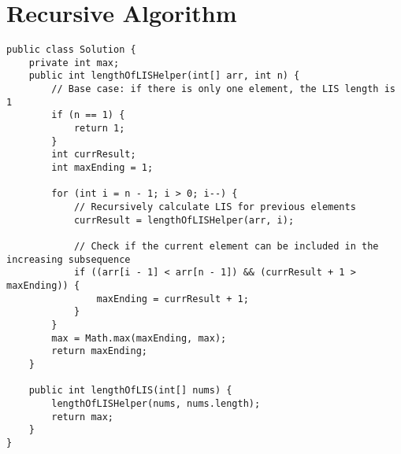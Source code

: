 \documentclass{article}
\begin{document}
\section{Recursive Algorithm}
\begin{lstlisting}[caption=$\mathcal{O}(2^{n})$ Recursive Algorithm]
public class Solution {
	private int max;
	public int lengthOfLISHelper(int[] arr, int n) {
		// Base case: if there is only one element, the LIS length is 1
		if (n == 1) {
			return 1;
		}
		int currResult;
		int maxEnding = 1;
		
		for (int i = n - 1; i > 0; i--) {
			// Recursively calculate LIS for previous elements
			currResult = lengthOfLISHelper(arr, i);
			
			// Check if the current element can be included in the increasing subsequence
			if ((arr[i - 1] < arr[n - 1]) && (currResult + 1 > maxEnding)) {
				maxEnding = currResult + 1;
			}
		}
		max = Math.max(maxEnding, max);
		return maxEnding;
	}
	
	public int lengthOfLIS(int[] nums) {
		lengthOfLISHelper(nums, nums.length);
		return max;
	}
}
\end{lstlisting}

\end{document}
